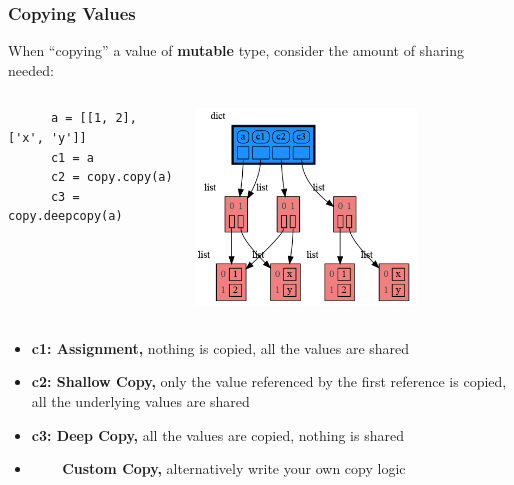 \documentclass[10pt, colorlinks=true, urlcolor=blue]{beamer}
\begin{document}
\begin{frame}[fragile]
  \frametitle{Copying Values}
  When ``copying'' a value of \textbf{mutable} type, consider the amount of sharing needed:
  \vspace{-1em}
\begin{columns}
  \begin{verbatim}
      a = [[1, 2], ['x', 'y']]
      c1 = a
      c2 = copy.copy(a)
      c3 = copy.deepcopy(a)
    \end{verbatim}
    \begin{center}\includegraphics[width=0.7\textwidth]{figures/copy.png}\end{center}
\end{columns}
    \begin{itemize}
        \item \textbf{c1: Assignment,} nothing is copied, all the values are shared
        \item \textbf{c2: Shallow Copy,} only the value referenced by the first reference is copied, all the underlying values are shared
        \item \textbf{c3: Deep Copy,} all the values are copied, nothing is shared
        \item \ \ \, \,\, \textbf{Custom Copy,} alternatively write your own copy logic
    \end{itemize}
\end{frame}
\end{document}
